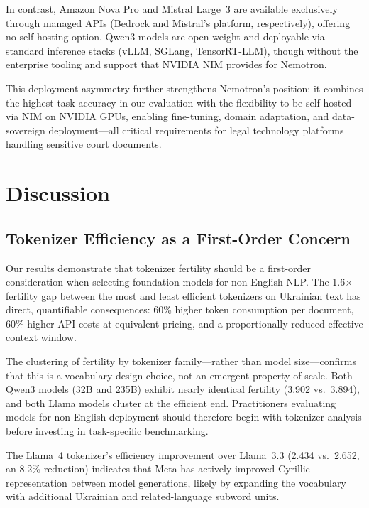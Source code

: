 \documentclass[11pt,a4paper]{article}
\begin{document}
In contrast, Amazon Nova Pro and Mistral Large~3 are available exclusively through managed APIs (Bedrock and Mistral's platform, respectively), offering no self-hosting option. Qwen3 models are open-weight and deployable via standard inference stacks (vLLM, SGLang, TensorRT-LLM), though without the enterprise tooling and support that NVIDIA NIM provides for Nemotron.

This deployment asymmetry further strengthens Nemotron's position: it combines the highest task accuracy in our evaluation with the flexibility to be self-hosted via NIM on NVIDIA GPUs, enabling fine-tuning, domain adaptation, and data-sovereign deployment---all critical requirements for legal technology platforms handling sensitive court documents.

\section{Discussion}

\subsection{Tokenizer Efficiency as a First-Order Concern}

Our results demonstrate that tokenizer fertility should be a first-order consideration when selecting foundation models for non-English NLP. The 1.6$\times$ fertility gap between the most and least efficient tokenizers on Ukrainian text has direct, quantifiable consequences: 60\% higher token consumption per document, 60\% higher API costs at equivalent pricing, and a proportionally reduced effective context window.

The clustering of fertility by tokenizer family---rather than model size---confirms that this is a vocabulary design choice, not an emergent property of scale. Both Qwen3 models (32B and 235B) exhibit nearly identical fertility (3.902 vs.\ 3.894), and both Llama models cluster at the efficient end. Practitioners evaluating models for non-English deployment should therefore begin with tokenizer analysis before investing in task-specific benchmarking.

The Llama~4 tokenizer's efficiency improvement over Llama~3.3 (2.434 vs.\ 2.652, an 8.2\% reduction) indicates that Meta has actively improved Cyrillic representation between model generations, likely by expanding the vocabulary with additional Ukrainian and related-language subword units.
\end{document}
